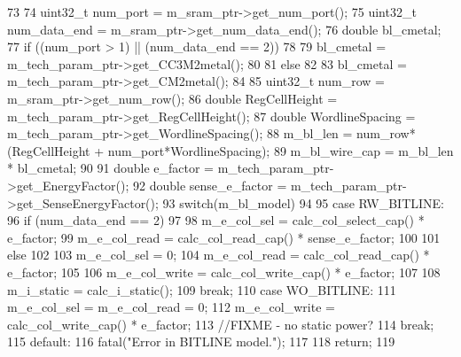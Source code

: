 \begin{DoxyCode}
73 {
74     uint32_t num_port = m_sram_ptr->get_num_port();
75     uint32_t num_data_end = m_sram_ptr->get_num_data_end();
76     double bl_cmetal;
77     if ((num_port > 1) || (num_data_end == 2))
78     {
79         bl_cmetal = m_tech_param_ptr->get_CC3M2metal();
80     }
81     else
82     {
83         bl_cmetal = m_tech_param_ptr->get_CM2metal();
84     }
85     uint32_t num_row = m_sram_ptr->get_num_row();
86     double RegCellHeight = m_tech_param_ptr->get_RegCellHeight();
87     double WordlineSpacing = m_tech_param_ptr->get_WordlineSpacing();
88     m_bl_len = num_row*(RegCellHeight + num_port*WordlineSpacing);
89     m_bl_wire_cap = m_bl_len * bl_cmetal;
90 
91     double e_factor = m_tech_param_ptr->get_EnergyFactor();
92     double sense_e_factor = m_tech_param_ptr->get_SenseEnergyFactor();
93     switch(m_bl_model)
94     {
95         case RW_BITLINE:
96             if (num_data_end == 2)
97             {
98                 m_e_col_sel = calc_col_select_cap() * e_factor;
99                 m_e_col_read = calc_col_read_cap() * sense_e_factor;
100             }
101             else
102             {
103                 m_e_col_sel = 0;
104                 m_e_col_read = calc_col_read_cap() * e_factor;
105             }
106             m_e_col_write = calc_col_write_cap() * e_factor;
107 
108             m_i_static = calc_i_static();
109             break;
110         case WO_BITLINE:
111             m_e_col_sel = m_e_col_read = 0;
112             m_e_col_write = calc_col_write_cap() * e_factor;
113             //FIXME - no static power?
114             break;
115         default:
116             fatal("Error in BITLINE model.\n");
117     }
118     return;
119 }
\end{DoxyCode}


